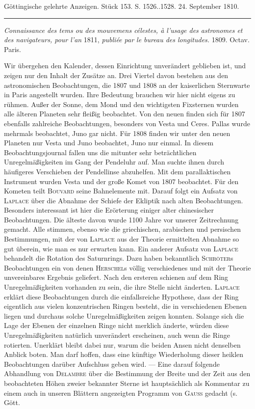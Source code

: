 \begin{center}\small Göttingische gelehrte Anzeigen. Stück 153. S. 1526..1528. 24. September 1810.\\[3pt]\rule{.72\linewidth}{.3pt}\end{center}

\emph{Connaissance des tems ou des mouvemens célestes, à l'usage des astronomes et des navigateurs, pour l'an} 1811, \emph{publiée par le bureau des longitudes.} 1809. Octav. Paris.

Wir übergehen den Kalender, dessen Einrichtung unverändert geblieben ist, und zeigen nur den Inhalt der Zusätze an. Drei Viertel davon bestehen aus den astronomischen Beobachtungen, die 1807 und 1808 an der kaiserlichen Sternwarte in Paris angestellt wurden. Ihre Bedeutung brauchen wir hier nicht eigens zu rühmen. Außer der Sonne, dem Mond und den wichtigsten Fixsternen wurden alle älteren Planeten sehr fleißig beobachtet. Von den neuen finden sich für 1807 ebenfalls zahlreiche Beobachtungen, besonders von Vesta und Ceres. Pallas wurde mehrmals beobachtet, Juno gar nicht. Für 1808 finden wir unter den neuen Planeten nur Vesta und Juno beobachtet, Juno nur einmal. In diesem Beobachtungsjournal fallen uns die mitunter sehr beträchtlichen Unregelmäßigkeiten im Gang der Pendeluhr auf. Man suchte ihnen durch häufigeres Verschieben der Pendellinse abzuhelfen. Mit dem parallaktischen Instrument wurden Vesta und der große Komet von 1807 beobachtet. Für den Kometen teilt \textsc{Bouvard} seine Bahnelemente mit. Darauf folgt ein Aufsatz von \textsc{Laplace} über die Abnahme der Schiefe der Ekliptik nach alten Beobachtungen. Besonders interessant ist hier die Erörterung einiger alter chinesischer Beobachtungen. Die älteste davon wurde 1100 Jahre vor unserer Zeitrechnung gemacht. Alle stimmen, ebenso wie die griechischen, arabischen und persischen Bestimmungen, mit der von \textsc{Laplace} aus der Theorie ermittelten Abnahme so gut überein, wie man es nur erwarten kann. Ein anderer Aufsatz von \textsc{Laplace} behandelt die Rotation des Saturnrings. Dazu haben bekanntlich \textsc{Schröter}s Beobachtungen ein von denen \textsc{Herschel}s völlig verschiedenes und mit der Theorie unvereinbares Ergebnis geliefert. Nach den ersteren schienen auf dem Ring Unregelmäßigkeiten vorhanden zu sein, die ihre Stelle nicht änderten. \textsc{Laplace} erklärt diese Beobachtungen durch die einfallsreiche Hypothese, dass der Ring eigentlich aus vielen konzentrischen Ringen besteht, die in verschiedenen Ebenen liegen und durchaus solche Unregelmäßigkeiten zeigen konnten. Solange sich die Lage der Ebenen der einzelnen Ringe nicht merklich änderte, würden diese Unregelmäßigkeiten natürlich unverändert erscheinen, auch wenn die Ringe rotierten. Unerklärt bleibt dabei nur, warum die beiden Ansen nicht denselben Anblick boten. Man darf hoffen, dass eine künftige Wiederholung dieser heiklen Beobachtungen darüber Aufschluss geben wird. — Eine darauf folgende Abhandlung von \textsc{Delambre} über die Bestimmung der Breite und der Zeit aus den beobachteten Höhen zweier bekannter Sterne ist hauptsächlich als Kommentar zu einem auch in unseren Blättern angezeigten Programm von \textsc{Gauss} gedacht (s. Gött. 